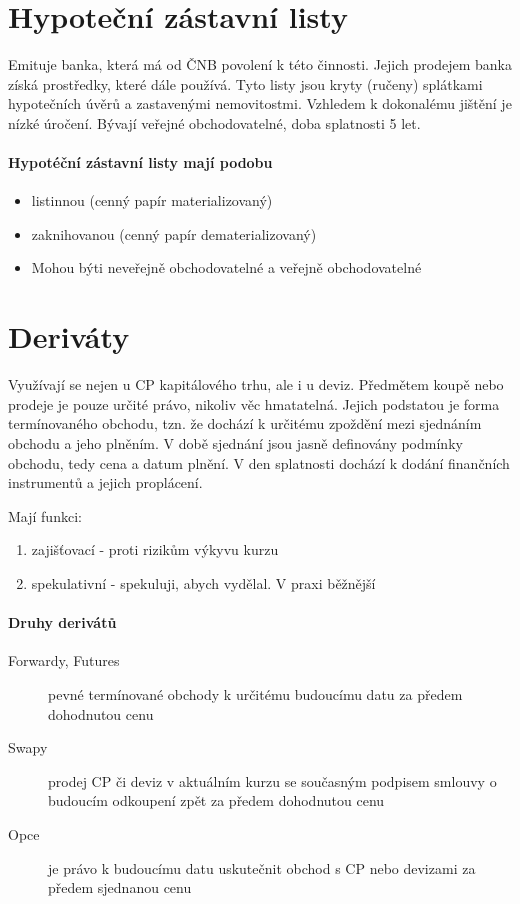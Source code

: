 \section*{Hypoteční zástavní listy}

Emituje banka, která má od ČNB povolení k této činnosti. Jejich prodejem banka získá prostředky, které dále používá. Tyto listy jsou kryty (ručeny) splátkami hypotečních úvěrů a zastavenými nemovitostmi. Vzhledem k dokonalému jištění je nízké úročení. Bývají veřejné obchodovatelné, doba splatnosti 5 let.

\paragraph{Hypotéční zástavní listy mají podobu}
\begin{itemize}
    \item listinnou (cenný papír materializovaný)
    \item zaknihovanou (cenný papír dematerializovaný)
    \item Mohou býti neveřejně obchodovatelné a veřejně obchodovatelné
\end{itemize}

\section*{Deriváty}

Využívají se nejen u CP kapitálového trhu, ale i u deviz. Předmětem koupě nebo prodeje je pouze určité právo, nikoliv věc hmatatelná. Jejich podstatou je forma termínovaného obchodu, tzn. že dochází k určitému zpoždění mezi sjednáním obchodu a jeho plněním. V době sjednání jsou jasně definovány podmínky obchodu, tedy cena a datum plnění. V den splatnosti dochází k dodání finančních instrumentů a jejich proplácení.

Mají funkci:
\begin{enumerate}
    \item zajišťovací - proti rizikům výkyvu kurzu
    \item spekulativní - spekuluji, abych vydělal. V praxi běžnější
\end{enumerate}

\paragraph{Druhy derivátů}
\begin{description}
    \item[Forwardy, Futures] pevné termínované obchody k určitému budoucímu datu za předem dohodnutou cenu
    \item[Swapy] prodej CP či deviz v aktuálním kurzu se současným podpisem smlouvy o budoucím odkoupení zpět za předem dohodnutou cenu
    \item[Opce] je právo k budoucímu datu uskutečnit obchod s CP nebo devizami za předem sjednanou cenu
\end{description}

